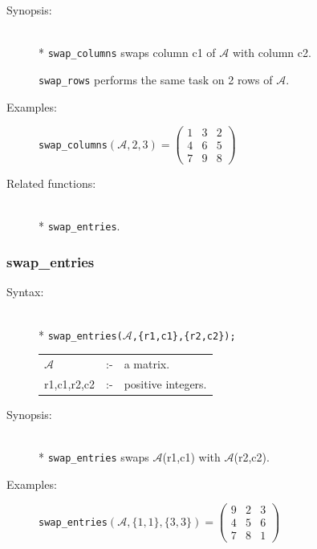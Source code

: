 {\begin{description}
\item[Synopsis:]\mbox{}\\*
\texttt{swap\_columns} swaps column c1 of $\mathcal{A}$ with column c2.

\texttt{swap\_rows} performs the same task on 2 rows of $\mathcal{A}$.

\item[Examples:]
\begin{flushleft}
\texttt{swap\_columns}\((\mathcal{A},2,3) =
        \begin{pmatrix} 1 & 3 & 2 \\ 4 & 6 & 5 \\ 7 & 9 & 8 \end{pmatrix}\)
\end{flushleft}

\item[Related functions:]\mbox{}\\*
\texttt{swap\_entries}.
\end{description}


\subsubsection{swap\_entries}
\label{linalg:swap_entries}
\hypertarget{operator:SWAP_ENTRIES}{}

\begin{description}
\item[Syntax:]\mbox{}\\*
{\tt swap\_entries($\mathcal{A}$,\{r1,c1\},\{r2,c2\});}\\[2mm]
\begin{tabular}{l l l}
$\mathcal{A}$  &:-& a matrix. \\
r1,c1,r2,c2 &:-& positive integers.
\end{tabular}

\item[Synopsis:]\mbox{}\\*
\texttt{swap\_entries} swaps $\mathcal{A}$(r1,c1) with
                $\mathcal{A}$(r2,c2).

\item[Examples:]
\begin{flushleft}
\texttt{swap\_entries}\((\mathcal{A},\{1,1\},\{3,3\}) =
        \begin{pmatrix} 9 & 2 & 3 \\ 4 & 5 & 6 \\ 7 & 8 & 1 \end{pmatrix}\)
\end{flushleft}


\end{description}}
